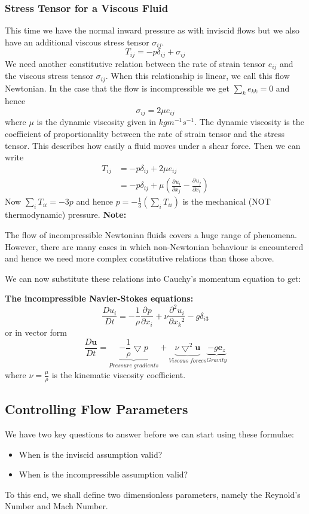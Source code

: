 \documentclass[11pt]{article}
\newcommand*{\pd}[3][]{\ensuremath{\frac{\partial^{#1} {#2}}{\partial {#3}^{#1}}}}
\newcommand*{\md}[1]{\ensuremath{\frac{D #1}{D t}}}
\newcommand{\grad}{\bigtriangledown}
\newcommand{\mv}[1]{\textbf{#1}}
\newcommand{\mdf}[1]{{\color{red}#1}}
\newenvironment{note}
    {\textbf{Note:}\begin{mdframed}[backgroundcolor=white, roundcorner=5pt, linewidth=0pt]}
    {\end{mdframed}}
\newenvironment{formula}
	{\begin{mdframed}[backgroundcolor=white, roundcorner=5pt, linewidth=1pt, linecolor=red]}
	{\end{mdframed}}
\begin{document}
\subsubsection{Stress Tensor for a Viscous Fluid}
This time we have the normal inward pressure as with inviscid flows but we also have an additional \mdf{viscous stress tensor} $\sigma_{ij}$.
$$T_{ij}=-p\delta_{ij}+\sigma_{ij}$$
We need another constitutive relation between the rate of strain tensor $e_{ij}$ and the viscous stress tensor $\sigma_{ij}$.
When this relationship is linear, we call this flow \mdf{Newtonian}.
In the case that the flow is incompressible we get $\sum_k e_{kk}=0$ and hence
$$\sigma_{ij}=2\mu e_{ij}$$
where $\mu$ is the dynamic viscosity given in $kgm^{-1}s^{-1}$. The dynamic viscosity is the coefficient of proportionality between the rate of strain tensor and the stress tensor. This describes how easily a fluid moves under a shear force.
Then we can write
\begin{align*}
	T_{ij}&= -p\delta_{ij}+2\mu e_{ij}\\
		  &= -p\delta_{ij}+\mu\left(\pd{u_i}{x_j}-\pd{u_j}{x_i}\right)
\end{align*}
Now $\sum_i T_{ii} = -3p$ and hence $p=-\frac{1}{3}(\sum_i T_{ii})$ is the mechanical (NOT thermodynamic) pressure.
\begin{note}
The flow of incompressible Newtonian fluids covers a huge range of phenomena.
However, there are many cases in which non-Newtonian behaviour is encountered and hence we need more complex constitutive relations than those above.
\end{note}
We can now substitute these relations into Cauchy's momentum equation to get:
\begin{formula}
\textbf{The incompressible Navier-Stokes equations:}
$$\md{u_i}=-\frac{1}{\rho}\pd{p}{x_i}+\nu\pd[2]{u_i}{x_k}-g\delta_{i3}$$
or in vector form
$$\md{\mv{u}}=\underbrace{-\frac{1}{\rho}\grad{p}}_{Pressure\;gradients}+\underbrace{\nu\grad^2\mv{u}}_{Viscous\;forces}\underbrace{-g\mv{e}_z}_{Gravity}$$
where $\nu=\frac{\mu}{\rho}$ is the \mdf{kinematic viscosity coefficient}.
\end{formula}
\subsection{Controlling Flow Parameters}
We have two key questions to answer before we can start using these formulae:
\begin{itemize}
	\item When is the inviscid assumption valid?
	\item When is the incompressible assumption valid?
\end{itemize}
To this end, we shall define two \mdf{dimensionless parameters}, namely the Reynold's Number and Mach Number.
\end{document}
